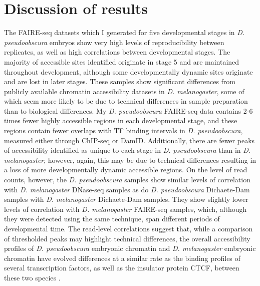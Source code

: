 \section{Discussion of results}
The FAIRE-seq datasets which I generated for five developmental stages in \emph{D. pseudoobscura} embryos show very high levels of reproducibility between replicates, as well as high correlations between developmental stages. The majority of accessible sites identified originate in stage 5 and are maintained throughout development, although some developmentally dynamic sites originate and are lost in later stages. These samples show significant differences from publicly available chromatin accessibility datasets in \emph{D. melanogaster}, some of which seem more likely to be due to technical differences in sample preparation than to biological differences. My \emph{D. pseudoobscura} FAIRE-seq data contains 2-6 times fewer highly accessible regions in each developmental stage, and these regions contain fewer overlaps with TF binding intervals in \emph{D. pseudoobscura}, measured either through ChIP-seq or DamID. Additionally, there are fewer peaks of accessibility identified as unique to each stage in \emph{D. pseudoobscura} than in \emph{D. melanogaster}; however, again, this may be due to technical differences resulting in a loss of more developmentally dynamic accessible regions. On the level of read counts, however, the \emph{D. pseudoobscura} samples show similar levels of correlation with \emph{D. melanogaster} DNase-seq samples as do \emph{D. pseudoobscura} Dichaete-Dam samples with \emph{D. melanogaster} Dichaete-Dam samples. They show slightly lower levels of correlation with \emph{D. melanogaster} FAIRE-seq samples, which, although they were detected using the same technique, span different periods of developmental time. The read-level correlations suggest that, while a comparison of thresholded peaks may highlight technical differences, the overall accessibility profiles of \emph{D. pseudoobscura} embryonic chromatin and \emph{D. melanogaster} embryonic chromatin have evolved differences at a similar rate as the binding profiles of several transcription factors, as well as the insulator protein CTCF, between these two species \citep{he_high_2011,ni_adaptive_2012,paris_extensive_2013}.\\

